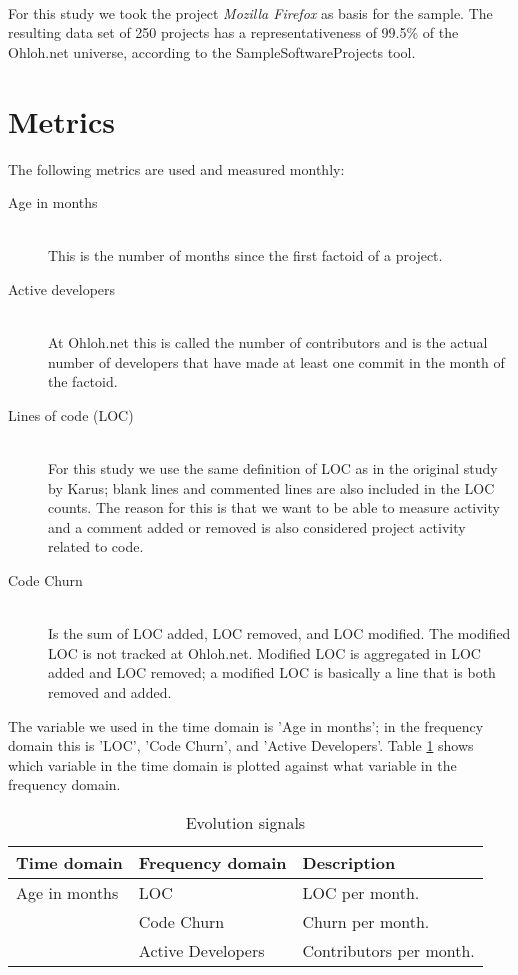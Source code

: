 \paragraph{}
For this study we took the project \emph{Mozilla Firefox }\rm as basis for
the sample. The resulting data set of 250 projects has a representativeness of
99.5\% of the Ohloh.net universe, according to the SampleSoftwareProjects tool.

\section{Metrics}
The following metrics are used and measured monthly:

\begin{description}
	\item[Age in months] \hfill \\
		This is the number of months since the first factoid of a project.

	\item[Active developers] \hfill \\
		At Ohloh.net this is called the number of contributors and is the actual
		number of developers that have made at least one commit in the month of the
		factoid.
	
	\item[Lines of code (LOC)] \hfill \\
		For this study we use the same definition of LOC as in the original study by
		Karus; blank lines and commented lines are also included in the LOC counts.
		The reason for this is that we want to be able to measure activity and a
		comment added or removed is also considered project activity related to code.

	\item[Code Churn] \hfill \\
		Is the sum of LOC added, LOC removed, and LOC modified. The modified LOC is
		not tracked at Ohloh.net. Modified LOC is aggregated in LOC added and LOC
		removed; a modified LOC is basically a line that is both removed and added.

\end{description}

\noindent
The variable we used in the time domain is 'Age in months'; in the
frequency domain this is 'LOC', 'Code Churn', and 'Active Developers'. Table
\ref{tab:series} shows which variable in the time domain is plotted against
what variable in the frequency domain.

\begin{table}
\centering
	\caption{Evolution signals}
	\begin{tabular}{| p{4cm} | p{4cm} | p{4cm} |}
	\hline
	Time domain & Frequency domain & Description \\ \hline
	Age in months   & LOC & LOC per month. \\
					& Code Churn & Churn per month. \\
					& Active Developers & Contributors per month. \\ \hline
	\end{tabular}
\label{tab:series}
\end{table}

